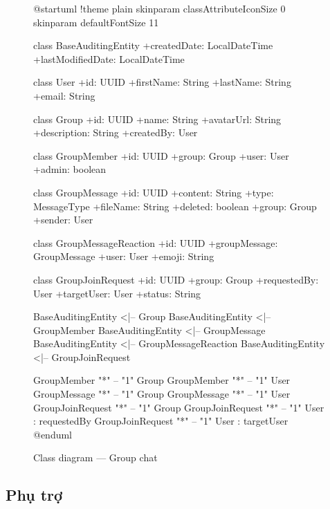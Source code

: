 \documentclass[12pt,a4paper]{report}
\begin{document}
\begin{figure}[H]
    \centering
    \begin{plantuml}
        @startuml
        !theme plain
        skinparam classAttributeIconSize 0
        skinparam defaultFontSize 11

        class BaseAuditingEntity {
            +createdDate: LocalDateTime
            +lastModifiedDate: LocalDateTime
        }

        class User {
            +id: UUID
            +firstName: String
            +lastName: String
            +email: String
        }

        class Group {
            +id: UUID
            +name: String
            +avatarUrl: String
            +description: String
            +createdBy: User
        }

        class GroupMember {
            +id: UUID
            +group: Group
            +user: User
            +admin: boolean
        }

        class GroupMessage {
            +id: UUID
            +content: String
            +type: MessageType
            +fileName: String
            +deleted: boolean
            +group: Group
            +sender: User
        }

        class GroupMessageReaction {
            +id: UUID
            +groupMessage: GroupMessage
            +user: User
            +emoji: String
        }

        class GroupJoinRequest {
            +id: UUID
            +group: Group
            +requestedBy: User
            +targetUser: User
            +status: String
        }

        BaseAuditingEntity <|-- Group
        BaseAuditingEntity <|-- GroupMember
        BaseAuditingEntity <|-- GroupMessage
        BaseAuditingEntity <|-- GroupMessageReaction
        BaseAuditingEntity <|-- GroupJoinRequest

        GroupMember "*" -- "1" Group
        GroupMember "*" -- "1" User
        GroupMessage "*" -- "1" Group
        GroupMessage "*" -- "1" User
        GroupJoinRequest "*" -- "1" Group
        GroupJoinRequest "*" -- "1" User : requestedBy
        GroupJoinRequest "*" -- "1" User : targetUser
        @enduml
    \end{plantuml}
    \caption{Class diagram --- Group chat}
\end{figure}

\subsection{Phụ trợ}
\end{document}
